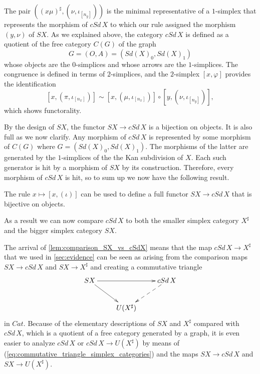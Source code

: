 The pair $((x\mu )^\sharp ,(\nu ,\iota _{[n_y]}))$ is
the minimal representative of a $1$-simplex that represents the morphism of $cSd\, X$ to which our rule assigned the morphism $(y,\nu )$ of $SX$. As we explained above, the category $cSd\, X$ is defined as a quotient of
the free category $C(G)$ of the graph
\[G=(O,A)=(Sd(X)_0,Sd(X)_1)\]
whose objects are the $0$-simplices and whose arrows are the $1$-simplices. The congruence is defined in terms of $2$-simplices, and the $2$-simplex $[x,\varphi ]$ provides the identification
\[[x,(\pi ,\iota _{[n_x]})]\sim [x,(\mu ,\iota _{[n_x]})]\circ [y,(\nu ,\iota _{[n_y]})],\]
which shows functorality.

By the design of $SX$, the functor $SX\to cSd\, X$ is a bijection on objects. It is also full as we now clarify. Any morphism of $cSd\, X$ is represented by some morphism of $C(G)$ where $G=(Sd(X)_0,Sd(X)_1)$. The morphisms of the latter are generated by the $1$-simplices of the the Kan subdivision of $X$. Each such generator is hit by a morphism of $SX$ by its construction. Therefore, every morphism of $cSd\, X$ is hit, so to sum up we now have the following result.
\begin{lemma}\label{lem:comparison_SX_vs_cSdX}
The rule $x\mapsto [x,(\iota )]$ can be used to define a full functor $SX\to cSd\, X$ that is bijective on objects.
\end{lemma}
\noindent As a result we can now compare $cSd\, X$ to both the smaller simplex category $X^\sharp$ and the bigger simplex category $SX$.

The arrival of \cref{lem:comparison_SX_vs_cSdX} means that the map $cSd\, X\to X^\sharp$ that we used in \cref{sec:evidence} can be seen as arising from the comparison maps $SX\to cSd\, X$ and $SX\to X^\sharp$ and creating a commutative triangle
\begin{equation}
\label{eq:commutative_triangle_simplex_categories}
\begin{gathered}
\xymatrix{
SX \ar[dr] \ar[rr] && cSd\, X \ar@{-->}[ld] \\
& U(X^\sharp )
}
\end{gathered}
\end{equation}
in $Cat$. Because of the elementary descriptions of $SX$ and $X^\sharp$ compared with $cSd\, X$, which is a quotient of a free category generated by a graph, it is even easier to analyze $cSd\, X$ or $cSd\, X\to U(X^\sharp )$ by means of (\ref{eq:commutative_triangle_simplex_categories}) and the maps $SX\to cSd\, X$ and $SX\to U(X^\sharp )$.

